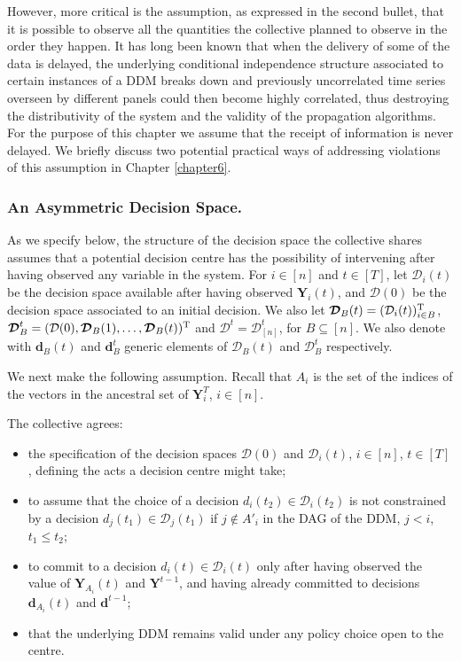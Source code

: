However, more critical is the assumption, as expressed in the second bullet, that it is possible to observe all the quantities the collective planned to observe in the order they happen. It has long been known that when the delivery of some of the data is delayed, the underlying conditional independence structure associated to certain instances of a DDM breaks down \citep{Queen1993} and previously uncorrelated time series  overseen by different panels could then become highly correlated, thus destroying the distributivity of the system and the validity of the propagation algorithms.  For the purpose of this chapter we assume that the receipt of information is never delayed. We briefly discuss two potential practical ways of addressing violations of this assumption in Chapter \ref{chapter6}.

\label{sec:ddm}
\subsubsection{An Asymmetric Decision Space.}
\label{sec:asydd}
As we specify below, the structure of the decision space the collective shares assumes  that a potential decision centre has the possibility of intervening after having observed any variable in the system. For $i\in[n]$ and $t\in [T]$, let $\mathcal{D}_i(t)$ be the decision space available after having observed $\bm{Y}_i(t)$, and $\mathcal{D}(0)$ be the decision space associated to an initial decision. We also let $\bm{\mathcal{D}}_B(t)=(\mathcal{D}_i(t))_{i\in B}^{\textnormal{T}}$,   $\bm{\mathcal{D}}^t_B=(\mathcal{D}(0), \bm{\mathcal{D}}_B(1),\dots, \bm{\mathcal{D}}_B(t))^{\textnormal{T}}$ and $\bm{\mathcal{D}}^t=\bm{\mathcal{D}}^t_{[n]}$, for $B\subseteq[n]$. We also denote with $\bm{d}_B(t)$ and $\bm{d}^t_B$ generic elements of $\bm{\mathcal{D}}_B(t)$ and $\bm{\mathcal{D}}^t_B$ respectively.

We next make the following assumption. Recall that $A_i$ is the set of the indices of the vectors in the ancestral set of $\bm{Y}^T_i$, $i\in[n]$.
\begin{assumption}
\label{strutass2}
The collective agrees:
\begin{itemize}
\item the specification of the  decision spaces $\mathcal{D}(0)$ and $\mathcal{D}_i(t)$, $i\in[n]$, $t\in[T]$, defining the acts a decision centre might take;
\item  to assume that the choice of  a decision $d_i(t_2)\in\mathcal{D}_i(t_2)$ is not constrained by a decision $d_j(t_1)\in\mathcal{D}_j(t_1)$ if $j\not\in A'_i$ in the DAG of the DDM, $j<i$, $t_1\leq t_2$;
\item to commit to a decision $d_i(t)\in\mathcal{D}_i(t)$ only after having observed the value of $\bm{Y}_{A_i}(t)$ and $\bm{Y}^{t-1}$, and having already committed to decisions $\bm{d}_{A_i}(t)$ and $\bm{d}^{t-1}$;
\item that the underlying DDM remains valid under any policy choice open to the centre.
\end{itemize}

\end{assumption}

